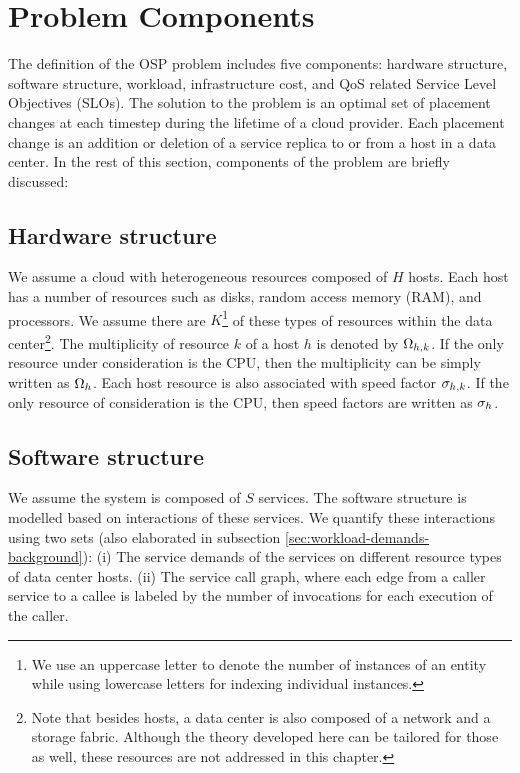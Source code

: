 \section{Problem Components}  
The definition of the OSP problem includes five components: hardware structure, software structure, workload, infrastructure cost, and QoS related Service Level Objectives (SLOs). The solution to the problem is an optimal set of placement changes at each timestep during the lifetime of a cloud provider. 
Each placement change is an addition or deletion of a service replica to or from a host in a data center. In the rest of this section, components of the problem are briefly discussed:  
  
\subsection{Hardware structure} We assume a cloud with heterogeneous resources composed of $H$ hosts. Each host has a number of resources such as disks, random access memory (RAM), and processors. We assume there are $K$\footnote{We use an uppercase letter to denote the number of instances of an entity while using lowercase letters for indexing individual instances.} of these types of resources within the data center\footnote{Note that besides hosts, a data center is also composed of a network and a storage fabric. Although the theory developed here can be tailored for those as well, these resources are not addressed in this chapter. }. The multiplicity of resource $k$ of a host $h$
 is denoted by $\Omega_{h,k}$. If the only resource under consideration is the CPU, then the multiplicity can be simply written as $\Omega_{h}$. Each host resource is also associated with speed factor $\sigma_{h,k}$. If the only resource of consideration is the CPU, then speed factors are written as $\sigma_{h}$. 

\subsection{Software structure} We assume the system is composed of $S$ services. The software structure is modelled based on interactions of these services. We quantify these interactions using two sets (also elaborated in subsection \ref{sec:workload-demands-background}):  
 (i) The service demands of the services on different resource types of data center hosts. 
 (ii) The service call graph, where each edge from a caller service to a callee is labeled by the number of invocations for each execution of the caller. 

